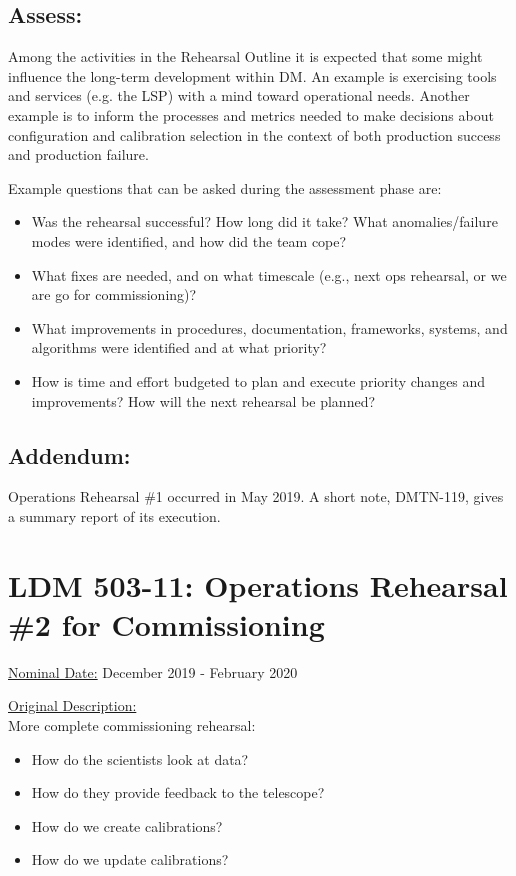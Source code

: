 \subsection{Assess:}

Among the activities in the Rehearsal Outline it is expected that some might influence the long-term development
within DM.  An example is exercising tools and services (e.g. the LSP) with a mind toward operational needs.  Another
example is to inform the processes and metrics needed to make decisions about configuration and calibration selection in the context of both production success and production failure.

Example questions that can be asked during the assessment phase are:
\begin{itemize}[topsep=-8pt]
\item Was the rehearsal successful? How long did it take? What anomalies/failure modes were identified, and how did the team cope? 
\item What fixes are needed, and on what timescale (e.g., next ops rehearsal, or we are go for commissioning)? 
\item What improvements in procedures, documentation, frameworks, systems, and algorithms were identified and at what priority?
\item How is time and effort budgeted to plan and execute priority changes and improvements? How will the next rehearsal be planned?
\end{itemize}

\subsection{Addendum:}
Operations Rehearsal \#1 occurred in May 2019.  A short note, DMTN-119, gives a summary 
report of its execution.

\clearpage

%
%
%

\section{LDM 503-11: Operations Rehearsal \#2 for Commissioning}

\underline{Nominal Date:} December 2019 - February 2020

\underline{Original Description:}\\
More complete commissioning rehearsal: 
\begin{itemize}[topsep=-8pt]
\item How do the scientists look at data? 
\item How do they provide feedback to the telescope?
\item How do we create calibrations?
\item How do we update calibrations?
\end{itemize}

